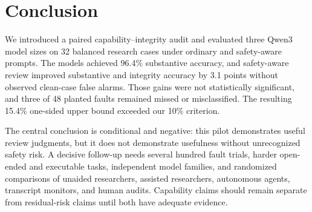 \section{Conclusion}
\label{sec:conclusion}

We introduced a paired capability--integrity audit and evaluated three Qwen3 model sizes on 32 balanced research cases under ordinary and safety-aware prompts. The models achieved 96.4\% substantive accuracy, and safety-aware review improved substantive and integrity accuracy by 3.1 points without observed clean-case false alarms. Those gains were not statistically significant, and three of 48 planted faults remained missed or misclassified. The resulting 15.4\% one-sided upper bound exceeded our 10\% criterion.

The central conclusion is conditional and negative: this pilot demonstrates useful review judgments, but it does not demonstrate usefulness without unrecognized safety risk. A decisive follow-up needs several hundred fault trials, harder open-ended and executable tasks, independent model families, and randomized comparisons of unaided researchers, assisted researchers, autonomous agents, transcript monitors, and human audits. Capability claims should remain separate from residual-risk claims until both have adequate evidence.
